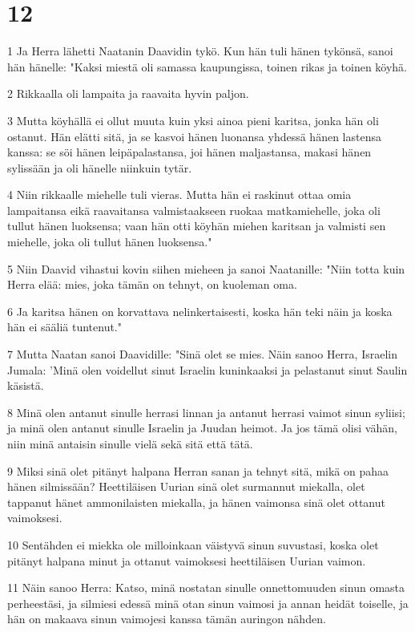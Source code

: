 \chapter{12}

\par 1 Ja Herra lähetti Naatanin Daavidin tykö. Kun hän tuli hänen tykönsä, sanoi hän hänelle: "Kaksi miestä oli samassa kaupungissa, toinen rikas ja toinen köyhä.
\par 2 Rikkaalla oli lampaita ja raavaita hyvin paljon.
\par 3 Mutta köyhällä ei ollut muuta kuin yksi ainoa pieni karitsa, jonka hän oli ostanut. Hän elätti sitä, ja se kasvoi hänen luonansa yhdessä hänen lastensa kanssa: se söi hänen leipäpalastansa, joi hänen maljastansa, makasi hänen sylissään ja oli hänelle niinkuin tytär.
\par 4 Niin rikkaalle miehelle tuli vieras. Mutta hän ei raskinut ottaa omia lampaitansa eikä raavaitansa valmistaakseen ruokaa matkamiehelle, joka oli tullut hänen luoksensa; vaan hän otti köyhän miehen karitsan ja valmisti sen miehelle, joka oli tullut hänen luoksensa."
\par 5 Niin Daavid vihastui kovin siihen mieheen ja sanoi Naatanille: "Niin totta kuin Herra elää: mies, joka tämän on tehnyt, on kuoleman oma.
\par 6 Ja karitsa hänen on korvattava nelinkertaisesti, koska hän teki näin ja koska hän ei sääliä tuntenut."
\par 7 Mutta Naatan sanoi Daavidille: "Sinä olet se mies. Näin sanoo Herra, Israelin Jumala: 'Minä olen voidellut sinut Israelin kuninkaaksi ja pelastanut sinut Saulin käsistä.
\par 8 Minä olen antanut sinulle herrasi linnan ja antanut herrasi vaimot sinun syliisi; ja minä olen antanut sinulle Israelin ja Juudan heimot. Ja jos tämä olisi vähän, niin minä antaisin sinulle vielä sekä sitä että tätä.
\par 9 Miksi sinä olet pitänyt halpana Herran sanan ja tehnyt sitä, mikä on pahaa hänen silmissään? Heettiläisen Uurian sinä olet surmannut miekalla, olet tappanut hänet ammonilaisten miekalla, ja hänen vaimonsa sinä olet ottanut vaimoksesi.
\par 10 Sentähden ei miekka ole milloinkaan väistyvä sinun suvustasi, koska olet pitänyt halpana minut ja ottanut vaimoksesi heettiläisen Uurian vaimon.
\par 11 Näin sanoo Herra: Katso, minä nostatan sinulle onnettomuuden sinun omasta perheestäsi, ja silmiesi edessä minä otan sinun vaimosi ja annan heidät toiselle, ja hän on makaava sinun vaimojesi kanssa tämän auringon nähden.
